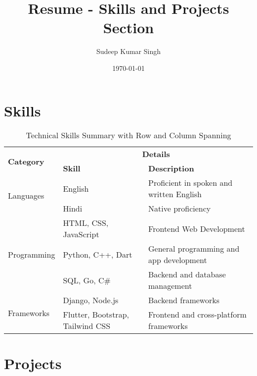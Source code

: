 \documentclass[12pt, a4paper]{article}
\title{\textbf{Resume - Skills and Projects Section}}
\author{Sudeep Kumar Singh}
\date{\today}
\begin{document}
\maketitle

\section*{Skills}

\begin{table}[h]
    \centering
    \begin{tabularx}{\textwidth}{|l|X|X|}
        \hline
        \multirow{2}{*}{\textbf{Category}} & \multicolumn{2}{c|}{\textbf{Details}} \\ \cline{2-3}
                                            & \textbf{Skill} & \textbf{Description} \\
        \hline
        \multirow{2}{*}{Languages} & English & Proficient in spoken and written English \\
                                    & Hindi & Native proficiency \\
        \hline
        \multirow{3}{*}{Programming} & HTML, CSS, JavaScript & Frontend Web Development \\
                                     & Python, C++, Dart & General programming and app development \\
                                     & SQL, Go, C\# & Backend and database management \\
        \hline
        \multirow{2}{*}{Frameworks} & Django, Node.js & Backend frameworks \\
                                     & Flutter, Bootstrap, Tailwind CSS & Frontend and cross-platform frameworks \\
        \hline
    \end{tabularx}
    \caption{Technical Skills Summary with Row and Column Spanning}
    \label{tab:skills}
\end{table}

\section*{Projects}
\end{document}
